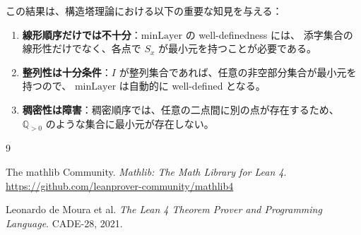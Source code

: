 \documentclass[a4paper,11pt]{ltjsarticle}
\theoremstyle{definition}
\theoremstyle{plain}
\theoremstyle{remark}
\newcommand{\Q}{\mathbb{Q}}
\newcommand{\minLayer}{\mathrm{minLayer}}
\begin{document}
この結果は、構造塔理論における以下の重要な知見を与える：

\begin{enumerate}
    \item \textbf{線形順序だけでは不十分}：$\minLayer$ の well-definedness には、
          添字集合の線形性だけでなく、各点で $S_x$ が最小元を持つことが必要である。
    \item \textbf{整列性は十分条件}：$I$ が整列集合であれば、任意の非空部分集合が最小元を持つので、
          $\minLayer$ は自動的に well-defined となる。
    \item \textbf{稠密性は障害}：稠密順序では、任意の二点間に別の点が存在するため、
          $\Q_{>0}$ のような集合に最小元が存在しない。
\end{enumerate}


\begin{thebibliography}{9}

The mathlib Community.
\textit{Mathlib: The Math Library for Lean 4}.
\url{https://github.com/leanprover-community/mathlib4}

Leonardo de Moura et al.
\textit{The Lean 4 Theorem Prover and Programming Language}.
CADE-28, 2021.

\end{thebibliography}
\end{document}
